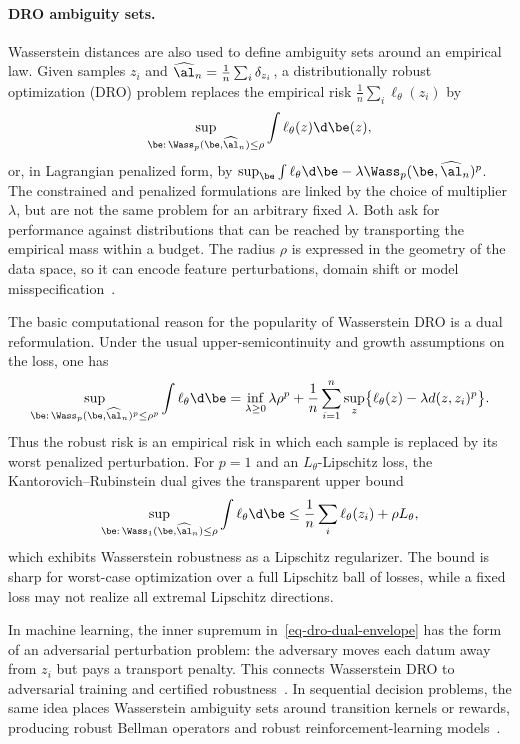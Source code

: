\paragraph{DRO ambiguity sets.}

Wasserstein distances are also used to define ambiguity sets around an empirical law. Given samples $z_i$ and $\widehat{\al}_n=\frac1n\sum_i\delta_{z_i}$, a distributionally robust optimization (DRO) problem replaces the empirical risk $\frac1n\sum_i \ell_\theta(z_i)$ by
\[
	\sup_{\be:\,\Wass_p(\be,\widehat{\al}_n)\leq \rho}
	\int \ell_\theta(z)\d\be(z),
\]
or, in Lagrangian penalized form, by $\sup_\be \int \ell_\theta\d\be-\lambda\Wass_p(\be,\widehat{\al}_n)^p$. The constrained and penalized formulations are linked by the choice of multiplier $\lambda$, but are not the same problem for an arbitrary fixed $\lambda$. Both ask for performance against distributions that can be reached by transporting the empirical mass within a budget. The radius $\rho$ is expressed in the geometry of the data space, so it can encode feature perturbations, domain shift or model misspecification~\cite{esfahani2018data,BlanchetMurthy2019,GaoKleywegt2016}.

The basic computational reason for the popularity of Wasserstein DRO is a dual reformulation. Under the usual upper-semicontinuity and growth assumptions on the loss, one has
\begin{equation}\label{eq-dro-dual-envelope}
	\sup_{\be:\,\Wass_p(\be,\widehat{\al}_n)^p\leq \rho^p}
	\int \ell_\theta\d\be
	=
	\inf_{\lambda\geq0}
	\lambda\rho^p
	+
	\frac1n\sum_{i=1}^n
	\sup_z\bigl\{\ell_\theta(z)-\lambda d(z,z_i)^p\bigr\}.
\end{equation}
Thus the robust risk is an empirical risk in which each sample is replaced by its worst penalized perturbation. For $p=1$ and an $L_\theta$-Lipschitz loss, the Kantorovich--Rubinstein dual gives the transparent upper bound
\[
	\sup_{\be:\,\Wass_1(\be,\widehat{\al}_n)\leq \rho}
	\int \ell_\theta\d\be
	\leq
	\frac1n\sum_i\ell_\theta(z_i)+\rho L_\theta,
\]
which exhibits Wasserstein robustness as a Lipschitz regularizer. The bound is sharp for worst-case optimization over a full Lipschitz ball of losses, while a fixed loss may not realize all extremal Lipschitz directions.

In machine learning, the inner supremum in~\eqref{eq-dro-dual-envelope} has the form of an adversarial perturbation problem: the adversary moves each datum away from $z_i$ but pays a transport penalty. This connects Wasserstein DRO to adversarial training and certified robustness~\cite{sinha2018certifying,NIPS2015_5745}. In sequential decision problems, the same idea places Wasserstein ambiguity sets around transition kernels or rewards, producing robust Bellman operators and robust reinforcement-learning models~\cite{xu2012distributionallyrobustmdp,yang2017convex}.

